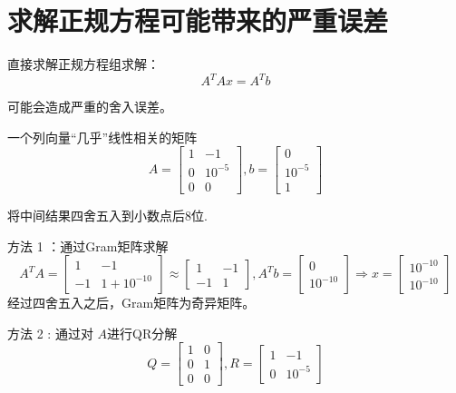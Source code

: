 \section{求解正规方程可能带来的严重误差}

直接求解正规方程组求解：
$$
A^{T} A x=A^{T} b
$$

可能会造成严重的舍入误差。

\begin{example}
    一个列向量“几乎”线性相关的矩阵
$$
A=\left[\begin{array}{cc}
1 & -1 \\
0 & 10^{-5} \\
0 & 0
\end{array}\right],  b=\left[\begin{array}{c}
0 \\
10^{-5} \\
1
\end{array}\right]
$$

将中间结果四舍五入到小数点后8位.

方法 1 ：通过Gram矩阵求解
$$
A^{T} A=\left[\begin{array}{cc}
1 & -1 \\
-1 & 1+10^{-10}
\end{array}\right] \approx\left[\begin{array}{cc}
1 & -1 \\
-1 & 1
\end{array}\right], A^{T} b=\left[\begin{array}{c}
0 \\
10^{-10}
\end{array}\right] \Rightarrow x=\left[\begin{array}{c}
10^{-10} \\
10^{-10}
\end{array}\right]
$$
经过四舍五入之后，Gram矩阵为奇异矩阵。


方法 2 : 通过对 $A$进行QR分解
$$
Q=\left[\begin{array}{ll}
1 & 0 \\
0 & 1 \\
0 & 0
\end{array}\right],  R=\left[\begin{array}{cc}
1 & -1 \\
0 & 10^{-5}
\end{array}\right]
$$


\end{example}

